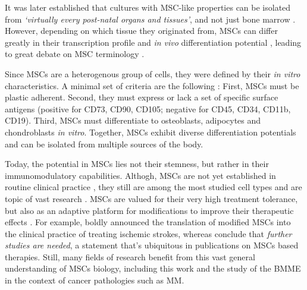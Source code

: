 It was later established that cultures with MSC-like properties can be isolated
from \textit{`virtually every post-natal organs and tissues'}, and not just bone
marrow \cite{dasilvameirellesMesenchymalStemCells2006}. However, depending on
which tissue they originated from, \acp{MSC} can differ greatly in their
transcription profile and \textit{in vivo} differentiation potential
\cite{jansenFunctionalDifferencesMesenchymal2010,
    sacchettiNoIdenticalMesenchymal2016}, leading to great debate on MSC terminology
\cite{robeyMesenchymalStemCells2017}.

Since \acp{MSC} are a heterogenous group of cells, they were defined by their
\textit{in vitro} characteristics. A minimal set of criteria are the following
\cite{dominiciMinimalCriteriaDefining2006}: First, \acp{MSC} must be plastic
adherent. Second, they must express or lack a set of specific surface antigens
(positive for CD73, CD90, CD105; negative for CD45, CD34, CD11b, CD19). Third,
\acp{MSC} must differentiate to osteoblasts, adipocytes and chondroblasts
\textit{in vitro}. Together, \acp{MSC} exhibit diverse differentiation
potentials and can be isolated from multiple sources of the body.

Today, the potential in \acp{MSC} lies not their stemness, but rather in their
immunomodulatory capabilities.
Althogh, \acp{MSC} are not yet established in routine clinical practice
, they still are among the most studied cell types and are topic
of vast research \cite{abdelrazikMesenchymalStemCells2023}. \acp{MSC} are valued
for their very high treatment tolerance, but also as an adaptive platform for
modifications to improve their therapeutic effects
\cite{dsouzaMesenchymalStemStromal2015}. For example,
\citet{chenTreatmentIschemicStroke2022} boldly announced the translation of
modified \acp{MSC} into the clinical practice of treating ischemic strokes,
whereas \citet{monivasgallegoMesenchymalStemCell2024} conclude that
\emph{further studies are needed}, a statement that's ubiquitous in publications
on \acp{MSC} based therapies. Still, many fields of research
benefit from this vast general understanding of \acp{MSC} biology, including
this work and the study of the \ac{BMME} in the context of cancer pathologies
such as \ac{MM}.






